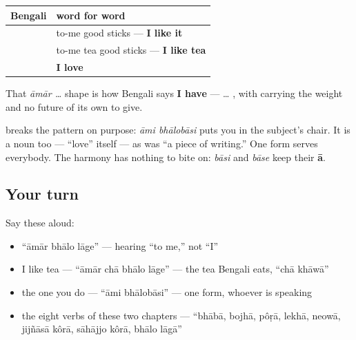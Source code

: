 \begin{grammarlens}[title={Grammar Lens: liking lands on you; loving you do}]
\noindent
\begin{tabularx}{\linewidth}{@{}>{\raggedright\arraybackslash}X>{\raggedright\arraybackslash}X@{}}
\toprule
\textbf{Bengali} & \textbf{word for word} \\
\midrule
\bn{আমার} \bn{ভালো} \bn{লাগে} & to-me good sticks — \textbf{I like it} \\
\bn{আমার} \bn{চা} \bn{ভালো} \bn{লাগে} & to-me tea good sticks — \textbf{I like tea} \\
\bn{আমি} \bn{ভালোবাসি} & \textbf{I love} \\
\bottomrule
\end{tabularx}

That \emph{āmār …} shape is how Bengali says \textbf{I have} —  … , with  carrying the weight and no future of its own to give.

\textbf{} breaks the pattern on purpose: \emph{āmi bhālobāsi} puts you in the subject's chair. It is a noun too — \textquotedblleft{}love\textquotedblright{} itself — as  was \textquotedblleft{}a piece of writing.\textquotedblright{} One form serves everybody. The harmony has nothing to bite on: \emph{bāsi} and \emph{bāse} keep their \textbf{ā}.
\end{grammarlens}

\subsection*{Your turn}
Say these aloud:

\begin{itemize}
\raggedright
  \item \textquotedblleft{}āmār bhālo lāge\textquotedblright{} — hearing \textquotedblleft{}to me,\textquotedblright{} not \textquotedblleft{}I\textquotedblright{}
  \item I like tea — \textquotedblleft{}āmār chā bhālo lāge\textquotedblright{} — the tea Bengali eats, \textquotedblleft{}chā khāwā\textquotedblright{}
  \item the one you do — \textquotedblleft{}āmi bhālobāsi\textquotedblright{} — one form, whoever is speaking
  \item the eight verbs of these two chapters — \textquotedblleft{}bhābā, bojhā, pôṛā, lekhā, neowā, jijñāsā kôrā, sāhājjo kôrā, bhālo lāgā\textquotedblright{}
\end{itemize}

